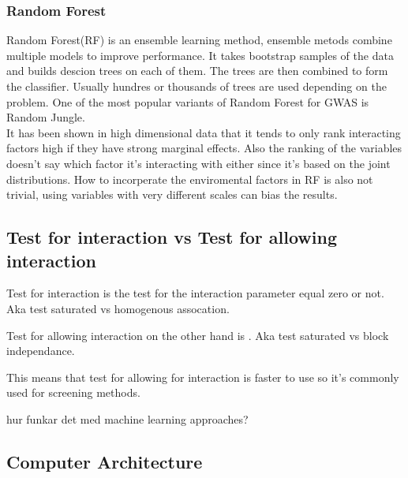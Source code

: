 \documentclass[10pt,a4paper]{article}
\begin{document}
\subsubsection{Random Forest}
Random Forest(RF) is an ensemble learning method, ensemble metods combine multiple models to improve performance. It takes bootstrap samples of the data and builds descion trees on each of them. The trees are then combined to form the classifier. Usually hundres or thousands of trees are used depending on the problem\cite{random_forest}. One of the most popular variants of Random Forest for GWAS is Random Jungle.\cite{random_jungle}
\\
It has been shown in high dimensional data that it tends to only rank interacting factors high if they have strong marginal effects\cite{winham_rf_2012}. Also the ranking of the variables doesn't say which factor it's interacting with either since it's based on the joint distributions\cite{gene_enviroment_2013}. How to incorperate the enviromental factors in RF is also not trivial, using variables with very different scales can bias the results\cite{gene_enviroment_2013}.


\subsection{Test for interaction vs Test for allowing interaction}
\label{test_type}
Test for interaction is the test for the interaction parameter equal zero or not. Aka test saturated vs homogenous assocation\cite{boost_gene_gene}.

Test for allowing interaction on the other hand is . Aka test saturated vs block independance\cite{boost_gene_gene}.

This means that test for allowing for interaction is faster to use so it's commonly used for screening methods. 

hur funkar det med machine learning approaches?

\cite{cordell_detect_review}
\clearpage
\subsection{Computer Architecture}
\end{document}
